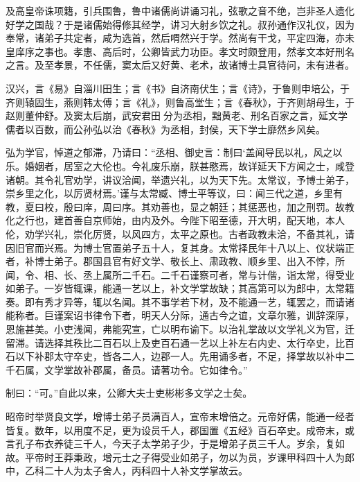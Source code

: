 \documentclass[12pt,UTF8]{ctexbook}
\begin{document}
及高皇帝诛项籍，引兵围鲁，鲁中诸儒尚讲诵习礼，弦歌之音不绝，岂非圣人遗化好学之国哉？于是诸儒始得修其经学，讲习大射乡饮之礼。叔孙通作汉礼仪，因为奉常，诸弟子共定者，咸为选首，然后喟然兴于学。然尚有干戈，平定四海，亦未皇庠序之事也。孝惠、高后时，公卿皆武力功臣。孝文时颇登用，然孝文本好刑名之言。及至孝景，不任儒，窦太后又好黄、老术，故诸博士具官待问，未有进者。



汉兴，言《易》自淄川田生；言《书》自济南伏生；言《诗》，于鲁则申培公，于齐则辕固生，燕则韩太傅；言《礼》，则鲁高堂生；言《春秋》，于齐则胡母生，于赵则董仲舒。及窦太后崩，武安君田分为丞相，黜黄老、刑名百家之言，延文学儒者以百数，而公孙弘以治《春秋》为丞相，封侯，天下学士靡然乡风矣。



弘为学官，悼道之郁滞，乃请曰：“丞相、御史言：制曰‘盖闻导民以礼，风之以乐。婚姻者，居室之大伦也。今礼废乐崩，朕甚愍焉，故详延天下方闻之士，咸登诸朝。其令礼官劝学，讲议洽闻，举遗兴礼，以为天下先。太常议，予博士弟子，崇乡里之化，以厉贤材焉。’谨与太常臧、博士平等议，曰：闻三代之道，乡里有教，夏曰校，殷曰庠，周曰序。其劝善也，显之朝廷；其惩恶也，加之刑罚。故教化之行也，建首善自京师始，由内及外。今陛下昭至德，开大明，配天地，本人伦，劝学兴礼，崇化厉贤，以风四方，太平之原也。古者政教未洽，不备其礼，请因旧官而兴焉。为博士官置弟子五十人，复其身。太常择民年十八以上、仪状端正者，补博士弟子。郡国县官有好文学、敬长上、肃政教、顺乡里、出入不悖，所闻，令、相、长、丞上属所二千石。二千石谨察可者，常与计偕，诣太常，得受业如弟子。一岁皆辄课，能通一艺以上，补文学掌故缺；其高第可以为郎中，太常籍奏。即有秀才异等，辄以名闻。其不事学若下材，及不能通一艺，辄罢之，而请诸能称者。巨谨案诏书律令下者，明天人分际，通古今之谊，文章尔雅，训辞深厚，恩施甚美。小吏浅闻，弗能究宣，亡以明布谕下。以治礼掌故以文学礼义为官，迁留滞。请选择其秩比二百石以上及吏百石通一艺以上补左右内史、太行卒史，比百石以下补郡太守卒史，皆各二人，边郡一人。先用诵多者，不足，择掌故以补中二千石属，文学掌故补郡属，备员。请著功令。它如律令。”



制曰：“可。”自此以来，公卿大夫士吏彬彬多文学之士矣。



昭帝时举贤良文学，增博士弟子员满百人，宣帝末增倍之。元帝好儒，能通一经者皆复。数年，以用度不足，更为设员千人，郡国置《五经》百石卒史。成帝末，或言孔子布衣养徒三千人，今天子太学弟子少，于是增弟子员三千人。岁余，复如故。平帝时王莽秉政，增元士之子得受业如弟子，勿以为员，岁课甲科四十人为郎中，乙科二十人为太子舍人，丙科四十人补文学掌故云。
\end{document}
